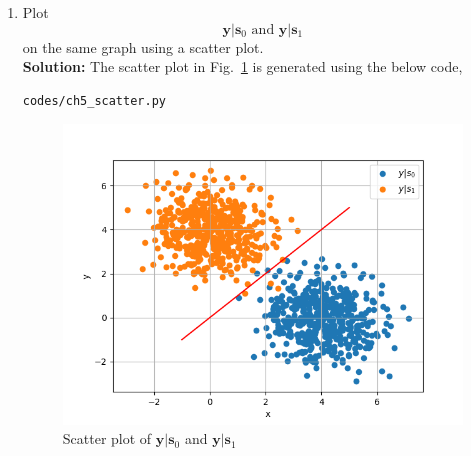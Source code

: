 \documentclass[journal,10pt,twocolumn]{article}
\newcommand\figref{Fig.~\ref}
\providecommand{\mbf}{\mathbf}
\newcommand{\solution}{\noindent \textbf{Solution: }}
\begin{document}
\begin{enumerate}
\item
\label{ch5_fsk}
Plot 
%
\begin{equation}
\mbf{y}|\mbf{s}_0 \text{ and } \mbf{y}|\mbf{s}_1
\end{equation}
%
on the same graph using a scatter plot.\\
\solution The scatter plot in \figref{fig:biv_scatter} is generated using the below code,
\begin{lstlisting}
codes/ch5_scatter.py
\end{lstlisting}
%
\begin{figure}[H]
\centering
\includegraphics[width=\columnwidth]{./chapters/ch5/figs/ch5_scatter.png}
\caption{Scatter plot of $\mbf{y}|\mbf{s}_0$ and $\mbf{y}|\mbf{s}_1$ }
\label{fig:biv_scatter}
\end{figure}


\end{enumerate}
\end{document}
